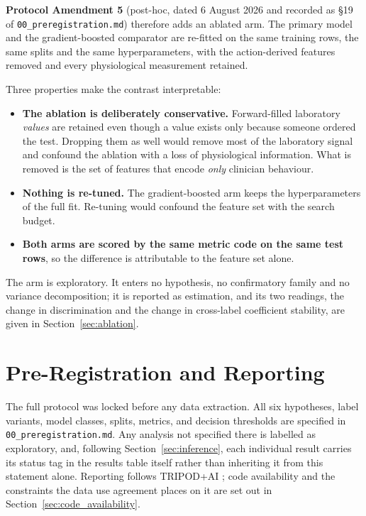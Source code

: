 \textbf{Protocol Amendment 5} (post-hoc, dated 6 August 2026 and recorded as
\S19 of \texttt{00\_preregistration.md}) therefore adds an ablated arm. The primary
model and the gradient-boosted comparator are re-fitted on the same training
rows, the same splits and the same hyperparameters, with the
\pcAblNDropped{} action-derived features removed and every physiological
measurement retained.

Three properties make the contrast interpretable:

\begin{itemize}
    \item \textbf{The ablation is deliberately conservative.} Forward-filled
          laboratory \emph{values} are retained even though a value exists only
          because someone ordered the test. Dropping them as well would remove
          most of the laboratory signal and confound the ablation with a loss
          of physiological information. What is removed is the set of features
          that encode \emph{only} clinician behaviour.
    \item \textbf{Nothing is re-tuned.} The gradient-boosted arm keeps the
          hyperparameters of the full fit. Re-tuning would confound the feature
          set with the search budget.
    \item \textbf{Both arms are scored by the same metric code on the same test
          rows}, so the difference is attributable to the feature set alone.
\end{itemize}

The arm is exploratory. It enters no hypothesis, no confirmatory family and no
variance decomposition; it is reported as estimation, and its two readings, the change in discrimination and the change in cross-label coefficient
stability, are given in Section~\ref{sec:ablation}.


\section{Pre-Registration and Reporting}

The full protocol was locked before any data extraction. All six hypotheses,
label variants, model classes, splits, metrics, and decision thresholds are
specified in \texttt{00\_preregistration.md}. Any analysis not specified there
is labelled as exploratory, and, following
Section~\ref{sec:inference}, each individual result carries its status tag in
the results table itself rather than inheriting it from this statement alone.
Reporting follows TRIPOD+AI \cite{collins2024tripodai}; code availability and
the constraints the data use agreement places on it are set out in
Section~\ref{sec:code_availability}.
